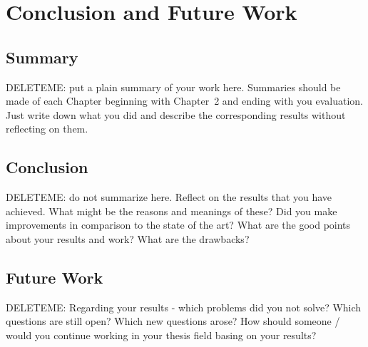 \chapter{Conclusion and Future Work}
\label{conclusion}
\section{Summary}
DELETEME: put a plain summary of your work here. Summaries should be made of each Chapter beginning with Chapter~2 and ending with you evaluation. Just write down what you did and describe the corresponding results without reflecting on them.

\section{Conclusion}
DELETEME: do not summarize here. Reflect on the results that you have achieved. What might be the reasons and meanings of these? Did you make improvements in comparison to the state of the art? What are the good points about your results and work? What are the drawbacks? 

\section{Future Work}
DELETEME: Regarding your results - which problems did you not solve? Which questions are still open? Which new questions arose? How should someone / would you continue working in your thesis field basing on your results?